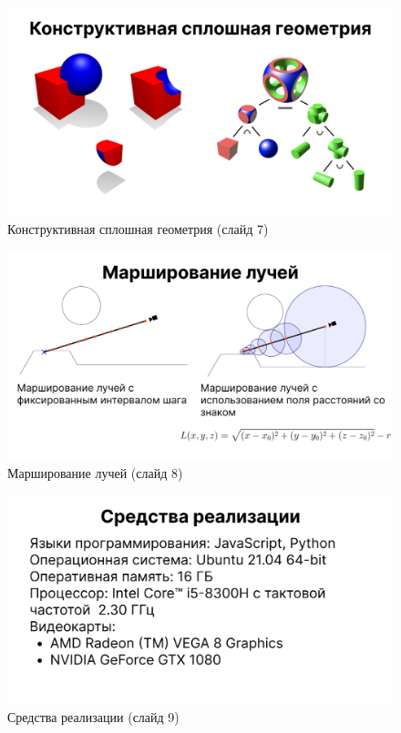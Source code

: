 \begin{figure}[h]
	\centering
	\captionsetup{justification=centering}
	\includegraphics[width=150mm]{img/slide7.png}
	\caption{Конструктивная сплошная геометрия (слайд 7)}
	\label{fig:slide-7}
\end{figure}

\begin{figure}[h]
	\centering
	\captionsetup{justification=centering}
	\includegraphics[width=150mm]{img/slide8.png}
	\caption{Марширование лучей (слайд 8)}
	\label{fig:slide-8}
\end{figure}

\begin{figure}[h]
	\centering
	\captionsetup{justification=centering}
	\includegraphics[width=150mm]{img/slide9.png}
	\caption{Средства реализации (слайд 9)}
	\label{fig:slide-9}
\end{figure}

